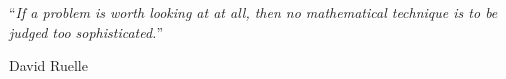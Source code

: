\documentclass[
11pt, %
ngerman,
english, %
singlespacing, %
headsepline, %
]{MastersDoctoralThesis} %
\begin{document}
\cleardoublepage


\vspace*{0.2\textheight}



\noindent\enquote{\itshape If a problem is worth looking at at all, then no mathematical technique is to be judged too sophisticated.}\bigbreak

\hfill David Ruelle 

\end{document}
